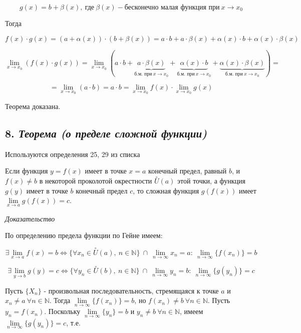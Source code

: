 $$
g(x) = b + \beta(x), \ \text{где} \ \beta(x) - \text{бесконечно малая функция при} \ x \rightarrow x_0 
$$

Тогда

$$
f(x)\cdot g(x) = (a + \alpha(x))\cdot(b + \beta(x)) = a\cdot b + a\cdot \beta(x) + \alpha(x)\cdot b + \alpha(x)\cdot \beta(x)
$$

$$
\lim\limits_{x \to x_0}(f(x)\cdot g(x)) = \lim\limits_{x \to x_0}(a\cdot b + \underbrace{a\cdot \beta(x)}_{\text{б.м. при} \ x \rightarrow x_0} + \underbrace{\alpha(x)\cdot b}_{\text{б.м. при} \ x \rightarrow x_0} + \underbrace{\alpha(x)\cdot \beta(x)}_{\text{б.м. при} \ x \rightarrow x_0}) =
$$

$$
= \lim\limits_{x \to x_0}(a\cdot b) = a\cdot b = \lim\limits_{x \to x_0}f(x) \cdot \lim\limits_{x \to x_0}g(x)
$$

Теорема доказана.
\newpage 
\subsection*{8. \textit{Теорема (о пределе сложной функции)}}
\begin{Quote2} 
\small\centering 

Используются определения 25, 29 из списка \end{Quote2} 

Если функция $y = f(x)$ имеет в точке $x = a$ конечный предел, равный $b$, и $f(x) \neq b$ в некоторой проколотой окрестности $\overset{\circ}U(a)$ этой точки, а функция $g(y)$ имеет в точке $b$ конечный предел $c$, то сложная функция $g(f(x))$ имеет $\lim\limits_{x \to a}g(f(x)) = c$.
\vspace*{20pt} 

\textit{Доказательство}

По определению предела функции по Гейне имеем:

$$
\exists \lim\limits_{x \to a}f(x) = b \iff \{\forall x_n \in \overset{\circ}U(a), \ n \in \mathbb{N}\} \ \cap \ \lim\limits_{n \to \infty}{x_n} = a : \ \lim\limits_{n \to \infty}\{f(x_n)\} = b
$$

$$
\exists \lim\limits_{y \to b}g(y) = c \iff \{\forall y_n \in \overset{\circ}U(b), \ n \in \mathbb{N}\} \ \cap \ \lim\limits_{n \to \infty}{y_n} = b : \ \lim\limits_{n \to \infty}\{g(y_n)\} = c
$$

Пусть $\{X_n\}$ - произвольная последовательность, стремящаяся к точке $a$ и $x_n \neq a \ \forall n \in \mathbb{N}$. Тогда $\lim\limits_{n \to \infty}{\{f(x_n)\}} = b$, но $f(x_n) \neq b \ \forall n \in \mathbb{N}$. Пусть $y_n = f(x_n)$. Поскольку $\lim\limits_{n \to \infty}{\{y_n\}} = b$ и $y_n \neq b \ \forall n \in \mathbb{N}$, имеем $\lim\limits_{n \to \infty}{\{g(y_n)\}} = c$, т.е.


